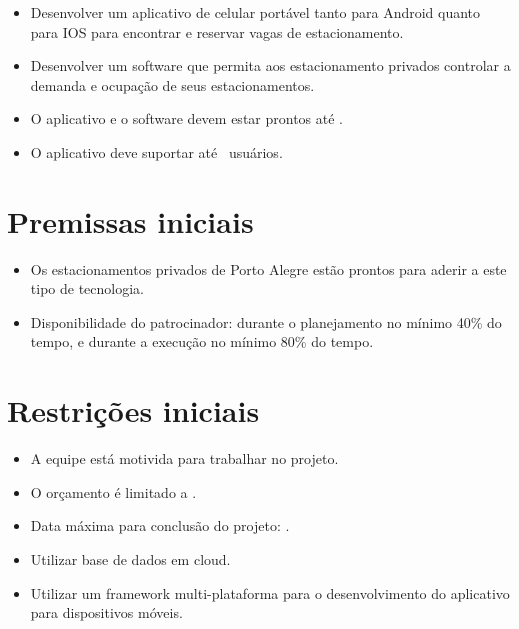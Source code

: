 
\begin{itemize}
	\item Desenvolver um aplicativo de celular portável tanto para Android quanto para IOS para encontrar e reservar vagas de estacionamento.
	\item Desenvolver um software que permita aos estacionamento privados controlar a demanda e ocupação de seus estacionamentos.
	\item O aplicativo e o software devem estar prontos até \maximumDeadline{}.
	\item O aplicativo deve suportar até \minimumUsersAmount{}\ usuários.
\end{itemize}




\section{Premissas iniciais}

\begin{itemize}
	\item Os estacionamentos privados de Porto Alegre estão prontos para aderir a este tipo de tecnologia.
	\item Disponibilidade do patrocinador: durante o planejamento no mínimo 40\% do tempo, e durante a execução no mínimo 80\% do tempo.
\end{itemize}

\section{Restrições iniciais}


\begin{itemize}
	\item A equipe está motivida para trabalhar no projeto.
	\item O orçamento é limitado a \maximumBudget{}.
	\item Data máxima para conclusão do projeto: \maximumDeadline{}.
	\item Utilizar base de dados em cloud.
	\item Utilizar um framework multi-plataforma para o desenvolvimento do aplicativo para dispositivos móveis.
\end{itemize}

